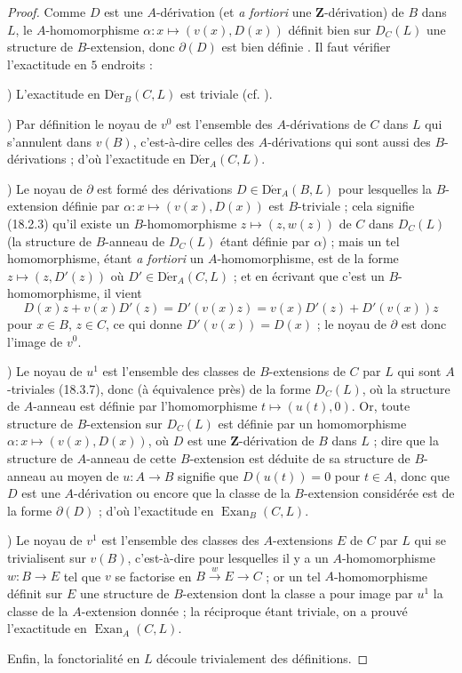 \begin{proof}
Comme $D$ est une $A$-dérivation (et \emph{a fortiori} une
$\mathbf{Z}$-dérivation) de $B$ dans $L$, le $A$-homomorphisme
$\alpha:x\mapsto(v(x),D(x))$ définit bien sur $D_C(L)$ une structure de
$B$-extension, donc $\partial(D)$ est bien définie . Il
faut vérifier l'exactitude en $5$ endroits :

\medskip
{})\enspace
L'exactitude en $\operatorname{D\acute{e}r}_B(C,L)$ est triviale (cf.
).

\medskip
{})\enspace
Par définition  le noyau de $v^0$ est l'ensemble des
$A$-dérivations de $C$ dans $L$ qui s'annulent dans $v(B)$, c'est-à-dire
celles des $A$-dérivations qui sont aussi des $B$-dérivations
 ; d'où l'exactitude en $\operatorname{D\acute{e}r}_A(C,L)$.

\medskip
{})\enspace
Le noyau de $\partial$ est formé des dérivations
$D\in\operatorname{D\acute{e}r}_A(B,L)$ pour lesquelles la $B$-extension définie par
$\alpha:x\mapsto(v(x),D(x))$ est $B$-triviale ; cela signifie (18.2.3) qu'il
existe un $B$-homomorphisme $z\mapsto(z,w(z))$ de $C$ dans $D_C(L)$ (la
structure de $B$-anneau de $D_C(L)$ étant définie par $\alpha$) ; mais un tel
homomorphisme, étant \emph{a fortiori} un $A$-homomorphisme, est de la forme
$z\mapsto(z,D'(z))$ où $D'\in\operatorname{D\acute{e}r}_A(C,L)$
 ; et en écrivant que c'est un $B$-homomorphisme, il vient
\[
  D(x)z+v(x)D'(z)=D'(v(x)z)=v(x)D'(z)+D'(v(x))z
\]
pour $x\in B$, $z\in C$, ce qui donne $D'(v(x))=D(x)$ ; le noyau de
$\partial$ est donc l'image de $v^0$.

\medskip
{})\enspace
Le noyau de $u^1$ est l'ensemble des classes de $B$-extensions de $C$ par
$L$ qui sont $A$-triviales (18.3.7), donc (à équivalence près) de la forme
$D_C(L)$, où la structure de $A$-anneau est définie par l'homomorphisme
$t\mapsto(u(t),0)$. Or, toute structure de $B$-extension sur $D_C(L)$ est
définie par un homomorphisme $\alpha:x\mapsto(v(x),D(x))$, où $D$ est une
$\mathbf{Z}$-dérivation de $B$ dans $L$  ; dire que la
structure de $A$-anneau de cette $B$-extension est déduite de sa structure de
$B$-anneau au moyen de $u:A\to B$ signifie que $D(u(t))=0$ pour $t\in A$,
donc que $D$ est une $A$-dérivation ou encore que la classe de la $B$-extension
considérée est de la forme $\partial(D)$ ; d'où l'exactitude en
$\operatorname{Exan}_B(C,L)$.

\medskip
{})\enspace
Le noyau de $v^1$ est l'ensemble des classes des $A$-extensions $E$ de $C$
par $L$ qui se trivialisent sur $v(B)$, c'est-à-dire pour lesquelles il y a un
$A$-homomorphisme $w:B\to E$ tel que $v$ se factorise en
$B\xrightarrow{w}E\to C$ ; or un tel $A$-homomorphisme définit sur $E$ une
structure de $B$-extension dont la classe a pour image par $u^1$ la classe de
la $A$-extension donnée ; la réciproque étant triviale, on a prouvé
l'exactitude en $\operatorname{Exan}_A(C,L)$.

Enfin, la fonctorialité en $L$ découle trivialement des définitions.
\end{proof}

